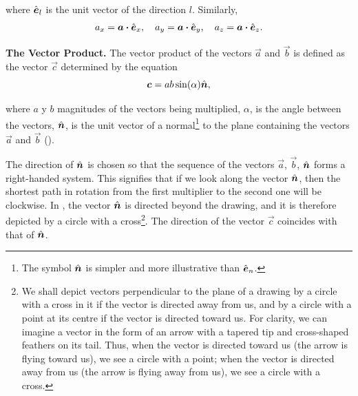 \noindent
where $\hat{\boldsymbol{e}}_{l}$ is the unit vector of the direction $l$. Similarly,
\begin{equation}\label{eq:1_26}
a_x = \boldsymbol{a}\boldsymbol{\cdot}\hat{\boldsymbol{e}}_{x},\quad  a_y = \boldsymbol{a}\boldsymbol{\cdot}\hat{\boldsymbol{e}}_{y}, \quad  a_z=\boldsymbol{a}\boldsymbol{\cdot}\hat{\boldsymbol{e}}_{z}.
\end{equation}

\textbf{The Vector Product.} The vector product of the vectors $\vec{a}$ and $\vec{b}$ is defined as the vector $\vec{c}$ determined by the equation
\begin{equation}\label{eq:1_27}
\boldsymbol{c} = ab\sin(\alpha)\hat{\boldsymbol{n}},
\end{equation}

\noindent
where $a$ y $b$ magnitudes of the vectors being multiplied, $\alpha$, is the angle between the vectors, $\hat{\boldsymbol{n}}$, is the unit vector of a normal\footnote{The symbol $\hat{\boldsymbol{n}}$ is simpler and more illustrative than $\hat{\boldsymbol{e}}_{n}$.} to the plane containing the vectors $\vec{a}$ and $\vec{b}$ ().

The direction of $\hat{\boldsymbol{n}}$ is chosen so that the sequence of the vectors $\vec{a}$, $\vec{b}$, $\hat{\boldsymbol{n}}$ forms a right-handed system. This signifies that if we look along the vector $\hat{\boldsymbol{n}}$, then the shortest path in rotation from the first multiplier to the second one will be clockwise. In , the vector $\hat{\boldsymbol{n}}$ is directed beyond the drawing, and it is therefore depicted by a circle with a cross\footnote{We shall depict vectors perpendicular to the plane of a drawing by a circle with a cross in it if the vector is directed away from us, and by a circle with a point at its centre if the vector is directed toward us. For clarity, we can imagine a vector in the form of an arrow with a tapered tip and cross-shaped feathers on its tail. Thus, when the vector is directed toward us (the arrow is flying toward us), we see a circle with a point; when the vector is directed away from us (the arrow is flying away from us), we see a circle with a cross.}. The direction of the vector $\vec{c}$ coincides with that of $\hat{\boldsymbol{n}}$.


